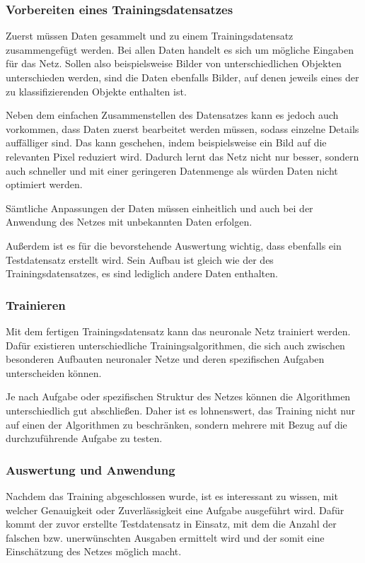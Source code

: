 \documentclass[12pt,a4]{article}
\begin{document}
\subsubsection{Vorbereiten eines Trainingsdatensatzes}
Zuerst müssen Daten gesammelt und zu einem Trainingsdatensatz zusammengefügt werden.
Bei allen Daten handelt es sich um mögliche Eingaben für das Netz. Sollen also beispielsweise Bilder von unterschiedlichen Objekten unterschieden werden, sind die Daten ebenfalls Bilder, auf denen jeweils eines der zu klassifizierenden Objekte enthalten ist.

Neben dem einfachen Zusammenstellen des Datensatzes kann es jedoch auch vorkommen, dass Daten zuerst bearbeitet werden müssen, sodass einzelne Details auffälliger sind. Das kann geschehen, indem beispielsweise ein Bild auf die relevanten Pixel reduziert wird. Dadurch lernt das Netz nicht nur besser, sondern auch schneller und mit einer geringeren Datenmenge als würden Daten nicht optimiert werden.

Sämtliche Anpassungen der Daten müssen einheitlich und auch bei der Anwendung des Netzes mit unbekannten Daten erfolgen.

Außerdem ist es für die bevorstehende Auswertung wichtig, dass ebenfalls ein Testdatensatz erstellt wird. Sein Aufbau ist gleich wie der des Trainingsdatensatzes, es sind lediglich andere Daten enthalten. 

\subsubsection{Trainieren}
Mit dem fertigen Trainingsdatensatz kann das neuronale Netz trainiert werden. Dafür existieren unterschiedliche Trainingsalgorithmen, die sich auch zwischen besonderen Aufbauten neuronaler Netze und deren spezifischen Aufgaben unterscheiden können. 

Je nach Aufgabe oder spezifischen Struktur des Netzes können die Algorithmen unterschiedlich gut abschließen. Daher ist es lohnenswert, das Training nicht nur auf einen der Algorithmen zu beschränken, sondern mehrere mit Bezug auf die durchzuführende Aufgabe zu testen.

\subsubsection{Auswertung und Anwendung}
Nachdem das Training abgeschlossen wurde, ist es interessant zu wissen, mit welcher Genauigkeit oder Zuverlässigkeit eine Aufgabe ausgeführt wird. Dafür kommt der zuvor erstellte Testdatensatz in Einsatz, mit dem die Anzahl der falschen bzw. unerwünschten Ausgaben ermittelt wird und der somit eine Einschätzung des Netzes möglich macht.
\end{document}
